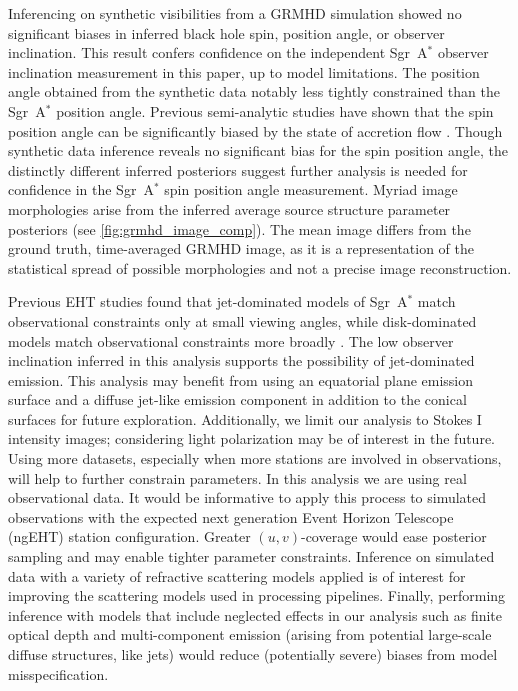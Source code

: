 \documentclass[linenumbers, twocolumn, tighten]{aastex701}
\def\sgra{Sgr~A$^*$\xspace}
\begin{document}
Inferencing on synthetic visibilities from a GRMHD simulation showed no significant biases in inferred black hole spin, position angle, or observer inclination. This result confers confidence on the independent \sgra observer inclination measurement in this paper, up to model limitations. The position angle obtained from the synthetic data notably less tightly constrained than the \sgra position angle. Previous semi-analytic studies have shown that the spin position angle can be significantly biased by the state of accretion flow . Though synthetic data inference reveals no significant bias for the spin position angle, the distinctly different inferred posteriors suggest further analysis is needed for confidence in the \sgra spin position angle measurement. Myriad image morphologies arise from the inferred average source structure parameter posteriors (see \autoref{fig:grmhd_image_comp}). The mean image differs from the ground truth, time-averaged GRMHD image, as it is a representation of the statistical spread of possible morphologies and not a precise image reconstruction.

Previous EHT studies found that jet-dominated models of \sgra match observational constraints only at small viewing angles, while disk-dominated models match observational constraints more broadly \citep{2019ApJ...871...30I}. The low observer inclination inferred in this analysis supports the possibility of jet-dominated emission. This analysis may benefit from using an equatorial plane emission surface and a diffuse jet-like emission component in addition to the conical surfaces for future exploration. Additionally, we limit our analysis to Stokes I intensity images; considering light polarization may be of interest in the future. Using more datasets, especially when more stations are involved in observations, will help to further constrain parameters. In this analysis we are using real observational data. It would be informative to apply this process to simulated observations with the expected next generation Event Horizon Telescope (ngEHT) station configuration. Greater $(u,v)$-coverage would ease posterior sampling and may enable tighter parameter constraints. Inference on simulated data with a variety of refractive scattering models applied is of interest for improving the scattering models used in processing pipelines. Finally, performing inference with models that include neglected effects in our analysis such as finite optical depth and multi-component emission (arising from potential large-scale diffuse structures, like jets) would reduce (potentially severe) biases from model misspecification.
\end{document}
